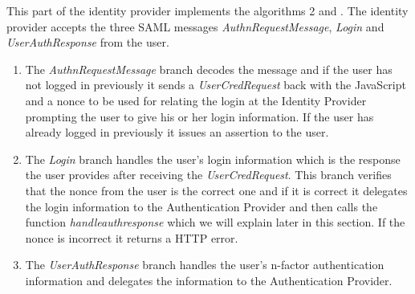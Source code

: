 \documentclass[twosided]{report}
\begin{document}
This part of the identity provider implements the algorithms 2 and . The identity provider accepts the three SAML messages \emph{AuthnRequestMessage}, \emph{Login} and \emph{UserAuthResponse} from the user.
\begin{enumerate}
\item The \emph{AuthnRequestMessage} branch decodes the message and if the user has not logged in previously it sends a \emph{UserCredRequest} back with the JavaScript and a nonce to be used for relating the login at the Identity Provider prompting the user to give his or her login information. If the user has already logged in previously it issues an assertion to the user.
\item The \emph{Login} branch handles the user's login information which is the response the user provides after receiving the \emph{UserCredRequest}. This branch verifies that the nonce from the user is the correct one and if it is correct it delegates the login information to the Authentication Provider and then calls the function \emph{handleauthresponse} which we will explain later in this section. If the nonce is incorrect it returns a HTTP error.
\item The \emph{UserAuthResponse} branch handles the user's n-factor authentication information and delegates the information to the Authentication Provider.
\end{enumerate}
\end{document}
